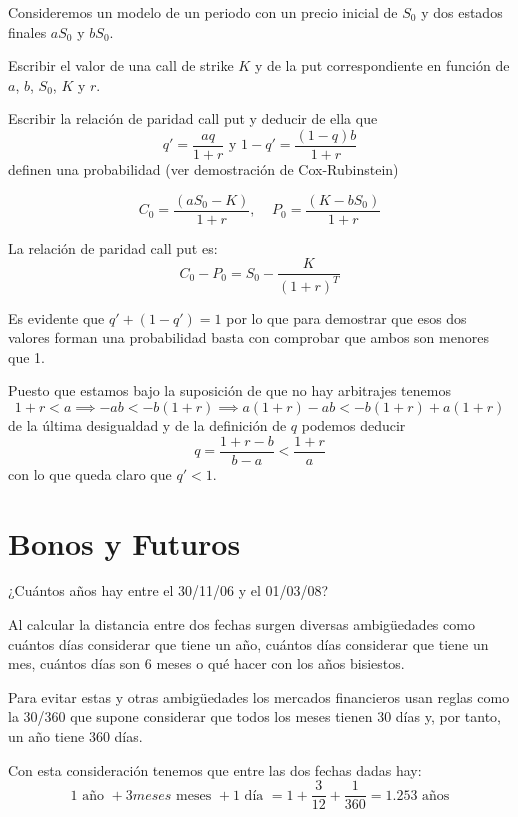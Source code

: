 \begin{problem}[8]
Consideremos un modelo de un periodo con un precio inicial de $S_0$ y dos estados finales $aS_0$ y $bS_0$.

\ppart Escribir el valor de una call de strike $K$ y de la put correspondiente en función de $a$, $b$, $S_0$, $K$ y $r$.

\ppart
Escribir la relación de paridad call put y deducir de ella que
\[q' =\frac{aq}{1+r} \text{ y } 1-q'=\frac{(1-q)b}{1+r}\]
definen una probabilidad (ver demostración de Cox-Rubinstein)

\solution
{}

\spart
\[C_0 = \frac{(aS_0-K)}{1+r}, \;\;\;\; P_0 = \frac{(K-bS_0)}{1+r}\]

\spart

La relación de paridad call put es:
\[C_0 - P_0 = S_0-\frac{K}{(1+r)^T}\]

Es evidente que $q'+(1-q')=1$ por lo que para demostrar que esos dos valores forman una probabilidad basta con comprobar que ambos son menores que 1.

Puesto que estamos bajo la suposición de que no hay arbitrajes tenemos
\[1+r < a \implies -ab < -b(1+r) \implies a(1+r)-ab < -b(1+r)+a(1+r)\]
de la última desigualdad y de la definición de $q$ podemos deducir
\[q=\frac{1+r-b}{b-a} < \frac{1+r}{a}\]
con lo que queda claro que $q'<1$.
\end{problem}

\section{Bonos y Futuros}

\begin{problem}[1]
¿Cuántos años hay entre el 30/11/06 y el 01/03/08?
\solution

Al calcular la distancia entre dos fechas surgen diversas ambigüedades como cuántos días considerar que tiene un año, cuántos días considerar que tiene un mes, cuántos días son 6 meses o qué hacer con los años bisiestos.

Para evitar estas y otras ambigüedades los mercados financieros usan reglas como la 30/360 que supone considerar que todos los meses tienen 30 días y, por tanto, un año tiene 360 días.

Con esta consideración tenemos que entre las dos fechas dadas hay:
\[1 \text{ año } + 3 meses \text{ meses } + 1 \text{ día } = 1 + \frac{3}{12} + \frac{1}{360} = 1.253 \text{ años}\]

\end{problem}

